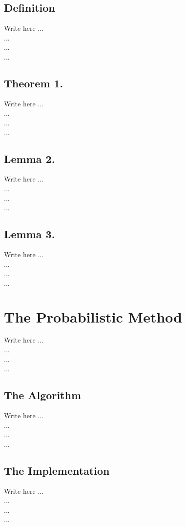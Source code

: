 \documentclass[conference]{IEEEtran}
\begin{document}
\subsection*{Definition}
    Write here ... \\
    ...  \\
    ...  \\
    ...  
    
\subsection*{Theorem 1.}
    Write here ... \\
    ...  \\
    ...  \\
    ...  
\subsection*{Lemma  2.}
    Write here ... \\
    ...  \\
    ...  \\
    ...  
\subsection*{Lemma  3.}
    Write here ... \\
    ...  \\
    ...  \\
    ...  



\section{The Probabilistic Method}
    Write here ... \\
    ...  \\
    ...  \\
    ...  

\subsection{The Algorithm}\label{AA}
    Write here ... \\
    ...  \\
    ...  \\
    ...  

\subsection{The Implementation}
    Write here ... \\
    ...  \\
    ...  \\
    ...  
\end{document}
